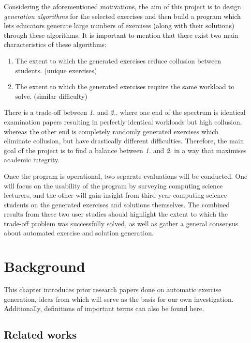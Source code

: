 \documentclass{l4proj}
\begin{document}
Considering the aforementioned motivations, the aim of this project is to design \emph{generation algorithms} for the selected exercises and then build a program which lets educators generate large numbers of exercises (along with their solutions) through these algorithms. It is important to mention that there exist two main characteristics of these algorithms:
\begin{enumerate}
	\item
	The extent to which the generated exercises reduce collusion between students. (unique exercises)
	\item
	The extent to which the generated exercises require the same workload to solve. (similar difficulty)
\end{enumerate}
There is a trade-off between \emph{1.} and \emph{2.}, where one end of the spectrum is identical examination papers resulting in perfectly identical workloads but high collusion, whereas the other end is completely randomly generated exercises which eliminate collusion, but have drastically different difficulties. Therefore, the main goal of the project is to find a balance between \emph{1.} and \emph{2.} in a way that maximises academic integrity.

Once the program is operational, two separate evaluations will be conducted. One will focus on the usability of the program by surveying computing science lecturers, and the other will gain insight from third year computing science students on the generated exercises and solutions themselves. The combined results from these two user studies should highlight the extent to which the trade-off problem was successfully solved, as well as gather a general consensus about automated exercise and solution generation.

\chapter{Background}
\label{chap:back}

This chapter introduces prior research papers done on automatic exercise generation, ideas from which will serve as the basis for our own investigation. Additionally, definitions of important terms can also be found here.

\section{Related works}
\end{document}
